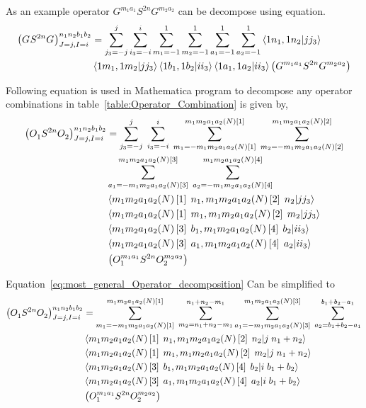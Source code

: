 \documentclass{article}
\newcommand{\bea}{\begin{eqnarray}}
\newcommand{\eea}{\end{eqnarray}}
\begin{document}
\vspace{5mm}


As an example operator $ G^{m_1 a_1} S^{2n} G^{m_2 a_2} $ can be decompose using equation.
\bea
\left(G^{} S^{2n} G^{}\right)^{n_1 n_2 b_1 b_2}_{J=j,I=i}&=\displaystyle\sum_{j_3=-j}^{j}\sum_{i_3=-i}^{i}\sum_{m_1=-1}^{1}\sum_{m_2=-1}^{1}\sum_{a_1=-1}^{1}\sum_{a_2=-1}^{1}\bra{1n_1,1n_2} \ket{jj_3}\nonumber \\
& \bra{1m_1,1m_2} \ket{jj_3}\bra{1b_1,1b_2} \ket{ii_3} \bra{1a_1,1a_2} \ket{ii_3} \left( G^{m_1 a_1} S^{2n} G^{m_2 a_2}\right)\nonumber 
\eea

\vspace{5mm}
Following equation is used in Mathematica program to decompose any operator combinations in table~\ref{table:Operator_Combination} is given by,
\bea
\left(O^{}_1 S^{2n} O^{}_2\right)^{n_1 n_2 b_1 b_2}_{J=j,I=i}&=\displaystyle\sum_{j_3=-j}^{j}\;\sum_{i_3=-i}^{i}\;\sum_{m_1=-m_1 m_2 a_1 a_2(N)\left[1\right]}^{m_1 m_2 a_1 a_2(N)\left[1\right]}\;\sum_{m_2=-m_1 m_2 a_1 a_2(N)\left[2\right]}^{m_1 m_2 a_1 a_2(N)\left[2\right]}\nonumber\\ &\displaystyle\sum_{a_1=-m_1 m_2 a_1 a_2(N)\left[3\right]}^{m_1 m_2 a_1 a_2(N)\left[3\right]}\;\sum_{a_2=-m_1 m_2 a_1 a_2(N)\left[4\right]}^{m_1 m_2 a_1 a_2(N)\left[4\right]}\nonumber\\ &\bra{m_1 m_2 a_1 a_2(N)\left[1\right]\;n_1,m_1 m_2 a_1 a_2(N)\left[2\right]\;n_2} \ket{jj_3}\nonumber\\ & \bra{m_1 m_2 a_1 a_2(N)\left[1\right]\;m_1,m_1 m_2 a_1 a_2(N)\left[2\right]\;m_2} \ket{jj_3}\nonumber\\ &\bra{m_1 m_2 a_1 a_2(N)\left[3\right]\;b_1,m_1 m_2 a_1 a_2(N)\left[4\right]\;b_2} \ket{ii_3} \nonumber\\ & \bra{m_1 m_2 a_1 a_2(N)\left[3\right]\;a_1,m_1 m_2 a_1 a_2(N)\left[4\right]\;a_2} \ket{ii_3} \nonumber\\ &\left( O^{m_1 a_1}_1 S^{2n} O^{m_2 a_2}_2\right) \label{eq:most_general_Operator_decomposition}
\eea

\vspace{5mm}
Equation~\ref{eq:most_general_Operator_decomposition} Can be simplified to
\bea
\left(O^{}_1 S^{2n} O^{}_2\right)^{n_1 n_2 b_1 b_2}_{J=j,I=i}&=\displaystyle\sum_{m_1=-m_1 m_2 a_1 a_2(N)\left[1\right]}^{m_1 m_2 a_1 a_2(N)\left[1\right]}\;\sum_{m_2=n_1+n_2-m_1}^{n_1+n_2-m_1}\sum_{a_1=-m_1 m_2 a_1 a_2(N)\left[3\right]}^{m_1 m_2 a_1 a_2(N)\left[3\right]}\;\sum_{a_2=b_1+b_2-a_1}^{b_1+b_2-a_1}\nonumber\\ &\bra{m_1 m_2 a_1 a_2(N)\left[1\right]\;n_1,m_1 m_2 a_1 a_2(N)\left[2\right]\;n_2} \ket{j\;n_1+n_2}\nonumber\\ & \bra{m_1 m_2 a_1 a_2(N)\left[1\right]\;m_1,m_1 m_2 a_1 a_2(N)\left[2\right]\;m_2} \ket{j\;n_1+n_2}\nonumber\\ &\bra{m_1 m_2 a_1 a_2(N)\left[3\right]\;b_1,m_1 m_2 a_1 a_2(N)\left[4\right]\;b_2} \ket{i\;b_1+b_2} \nonumber\\ & \bra{m_1 m_2 a_1 a_2(N)\left[3\right]\;a_1,m_1 m_2 a_1 a_2(N)\left[4\right]\;a_2} \ket{i\;b_1+b_2} \nonumber\\ &\left( O^{m_1 a_1}_1 S^{2n} O^{m_2 a_2}_2\right) \label{eq:most_general_Operator_decomposition_simplified}
\eea
\end{document}
